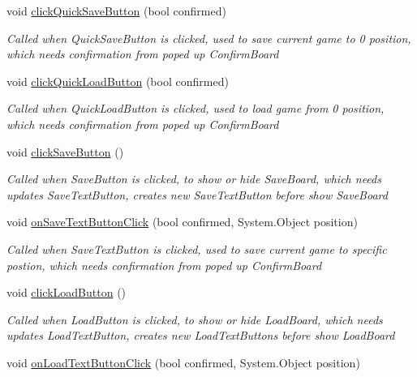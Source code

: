 \begin{DoxyCompactItemize}
void \hyperlink{classdoki_unity_1_1_world_control_a59aab116fa2e6e50008b07c01ba905b7}{click\+Quick\+Save\+Button} (bool confirmed)
\begin{DoxyCompactList}\small\item\em Called when Quick\+Save\+Button is clicked, used to save current game to 0 position, which needs confirmation from poped up Confirm\+Board \end{DoxyCompactList}\item 
void \hyperlink{classdoki_unity_1_1_world_control_a1d05a29567a665053aebf308c6b79886}{click\+Quick\+Load\+Button} (bool confirmed)
\begin{DoxyCompactList}\small\item\em Called when Quick\+Load\+Button is clicked, used to load game from 0 position, which needs confirmation from poped up Confirm\+Board \end{DoxyCompactList}\item 
void \hyperlink{classdoki_unity_1_1_world_control_a1eebc8a7a6d85e8864f05498d39751b8}{click\+Save\+Button} ()
\begin{DoxyCompactList}\small\item\em Called when Save\+Button is clicked, to show or hide Save\+Board, which needs updates Save\+Text\+Button, creates new Save\+Text\+Button before show Save\+Board \end{DoxyCompactList}\item 
void \hyperlink{classdoki_unity_1_1_world_control_a18cb218542ba16a3cb127a3bf134e304}{on\+Save\+Text\+Button\+Click} (bool confirmed, System.\+Object position)
\begin{DoxyCompactList}\small\item\em Called when Save\+Text\+Button is clicked, used to save current game to specific postion, which needs confirmation from poped up Confirm\+Board \end{DoxyCompactList}\item 
void \hyperlink{classdoki_unity_1_1_world_control_aa98acf0c81a8ec1e31d3f2ae72b5a8cb}{click\+Load\+Button} ()
\begin{DoxyCompactList}\small\item\em Called when Load\+Button is clicked, to show or hide Load\+Board, which needs updates Load\+Text\+Button, creates new Load\+Text\+Buttons before show Load\+Board \end{DoxyCompactList}\item 
void \hyperlink{classdoki_unity_1_1_world_control_a9b21814247603741c6687f2eb931e9dc}{on\+Load\+Text\+Button\+Click} (bool confirmed, System.\+Object position)

\end{DoxyCompactItemize}
